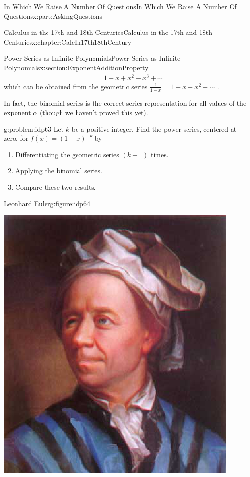 \documentclass[oneside,10pt,]{book}
\numberwithin{equation}{section}
\newcommand{\amp}{&}
\begin{document}
\begin{partptx}{In Which We Raise A Number Of Questions}{}{In Which We Raise A Number Of Questions}{}{}{x:part:AskingQuestions}
\begin{chapterptx}{Calculus in the 17th and 18th Centuries}{}{Calculus in the 17th and 18th Centuries}{}{}{x:chapter:CalcIn17th18thCentury}
\begin{sectionptx}{Power Series as Infinite Polynomials}{}{Power Series as Infinite Polynomials}{}{}{x:section:ExponentAdditionProperty}
\begin{align*}
\amp =1-x+x^2-x^3+\cdots
\end{align*}
which can be obtained from the geometric series \(\frac{1}{1-x}=1+x+x^2+\cdots\) .%
\par
In fact, the binomial series is the correct series representation for all values of the exponent \(\alpha\) (though we haven't proved this yet).%
\begin{problem}{}{g:problem:idp63}%
Let \(k\) be a positive integer. Find the power series, centered at zero, for \(f(x) = \left(1-x\right)^{-k}\) by%
\begin{enumerate}[font=\bfseries,label=(\alph*),ref=\alph*]
\item{}Differentiating the  geometric series \(\left(k-1\right)\) times.%
\item{}Applying the binomial series.%
\item{}Compare these two results.%
\end{enumerate}
\end{problem}
\begin{figureptx}{\href{https://mathshistory.st-andrews.ac.uk/Biographies/Euler/}{Leonhard Euler}\protect\footnotemark{}}{g:figure:idp64}{}%
%
\begin{image}{0.325}{0.35}{0.325}%
\includegraphics[width=\linewidth]{images/Euler.png}

\end{image}
\end{figureptx}
\end{sectionptx}
\end{chapterptx}
\end{partptx}
\end{document}
